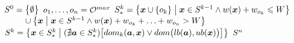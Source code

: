 \begin{algorithmic}[1]
    \State $S^0 = \big\{\emptyset\big\}$
    \State $o_1, \ldots, o_n = \mathcal{O}^{max}$
      \State $S_*^k = \big\{\boldsymbol{x} \cup \{o_k\} \;\big|\; \boldsymbol{x}
        \in S^{k-1} \land w(\boldsymbol{x}) + w_{o_k} \leqslant W \big\}$
      \State $\phantom{\solSett^k = } \cup \big\{ \sol{x} \;\big|\; \sol{x} \in \solSet^{k-1} \logicAnd
        \weight{x} + w_{o_k} + \ldots + w_{o_n} > W \big\}$
      \State $S^k = \left\{\boldsymbol{x} \in S_*^k \;\middle|\;
        (\nexists \boldsymbol{a} \in S_*^k)\big[dom_k(\boldsymbol{a}, \boldsymbol{x})
          \lor dom\big(lb(\boldsymbol{a}), ub(\boldsymbol{x})\big)\big] \right\}$
    \EndFor
    \State \Return $S^n$
  \EndFunction
\end{algorithmic}
